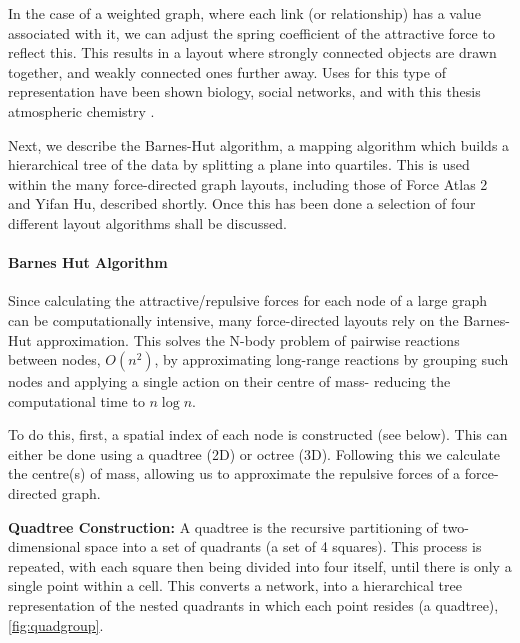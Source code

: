 In the case of a weighted graph, where each link (or relationship) has a value associated with it, we can adjust the spring coefficient of the attractive force to reflect this. This results in a layout where strongly connected objects are drawn together, and weakly connected ones further away. Uses for this type of representation have been shown biology, social networks, and with this thesis atmospheric chemistry \citep{ch3,ch4}.

Next, we describe the Barnes-Hut algorithm, a mapping algorithm which builds a hierarchical tree of the data by splitting a plane into quartiles. This is used within the many force-directed graph layouts, including those of Force Atlas 2 and Yifan Hu, described shortly. Once this has been done a selection of four different layout algorithms shall be discussed.  


\paragraph*{Barnes Hut Algorithm}
Since calculating the attractive/repulsive forces for each node of a large graph can be computationally intensive, many force-directed layouts rely on the Barnes-Hut approximation. This solves the N-body problem of pairwise reactions between nodes, $O(n^2)$, by approximating long-range reactions by grouping such nodes and applying a single action on their centre of mass- reducing the computational time to $n \log n$.  

To do this, first, a spatial index of each node is constructed (see below). This can either be done using a quadtree (2D) or octree (3D). Following this we calculate the centre(s) of mass, allowing us to approximate the repulsive forces of a force-directed graph.

\textbf{Quadtree Construction:}
A quadtree is the recursive partitioning of two-dimensional space into a set of quadrants (a set of 4 squares). This process is repeated, with each square then being divided into four itself, until there is only a single point within a cell. This converts a network, into a hierarchical tree representation of the nested quadrants in which each point resides (a quadtree), \autoref{fig:quadgroup}. 


